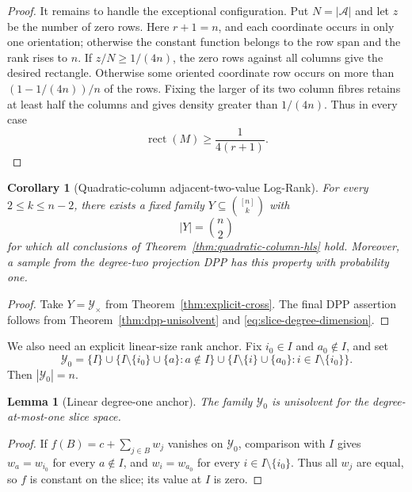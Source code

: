 \documentclass[11pt]{article}
\newtheorem{lemma}[theorem]{Lemma}
\newtheorem{corollary}[theorem]{Corollary}
\theoremstyle{definition}
\theoremstyle{remark}
\newcommand{\cA}{\mathcal A}
\newcommand{\cY}{\mathcal Y}
\newcommand{\1}{\mathbf 1}
\newcommand{\rect}{\operatorname{rect}}
\begin{document}
\begin{proof}
It remains to handle the exceptional configuration.  Put $N=|\cA|$ and let
$z$ be the number of zero rows.  Here $r+1=n$, and each coordinate occurs in
only one orientation; otherwise the constant function belongs to the row
span and the rank rises to $n$.  If $z/N\ge1/(4n)$, the zero rows against all
columns give the desired rectangle.  Otherwise some oriented coordinate row
occurs on more than $(1-1/(4n))/n$ of the rows.  Fixing the larger of its two
column fibres retains at least half the columns and gives density greater
than $1/(4n)$.  Thus in every case
\[
 \rect(M)\ge\frac1{4(r+1)}.
\]
\end{proof}

\begin{corollary}[Quadratic-column adjacent-two-value Log-Rank]
\label{cor:quadratic-column-hls}
For every $2\le k\le n-2$, there exists a fixed family
$Y\subseteq\binom{[n]}k$ with
\[
 |Y|=\binom n2
\]
for which all conclusions of Theorem~\ref{thm:quadratic-column-hls} hold.
Moreover, a sample from the degree-two projection DPP has this property with
probability one.
\end{corollary}

\begin{proof}
Take $Y=\cY_\times$ from Theorem~\ref{thm:explicit-cross}.  The final DPP
assertion follows from Theorem~\ref{thm:dpp-unisolvent} and
\eqref{eq:slice-degree-dimension}.
\end{proof}

We also need an explicit linear-size rank anchor.  Fix $i_0\in I$ and
$a_0\notin I$, and set
\begin{equation}\label{eq:linear-rank-anchor}
 \cY_0=\{I\}
 \cup\{I\setminus\{i_0\}\cup\{a\}:a\notin I\}
 \cup\{I\setminus\{i\}\cup\{a_0\}:i\in I\setminus\{i_0\}\}.
\end{equation}
Then $|\cY_0|=n$.

\begin{lemma}[Linear degree-one anchor]
\label{lem:linear-rank-anchor}
The family $\cY_0$ is unisolvent for the degree-at-most-one slice space.
\end{lemma}

\begin{proof}
If $f(B)=c+\sum_{j\in B}w_j$ vanishes on $\cY_0$, comparison with $I$ gives
$w_a=w_{i_0}$ for every $a\notin I$, and $w_i=w_{a_0}$ for every
$i\in I\setminus\{i_0\}$.  Thus all $w_j$ are equal, so $f$ is constant on
the slice; its value at $I$ is zero.
\end{proof}
\end{document}
